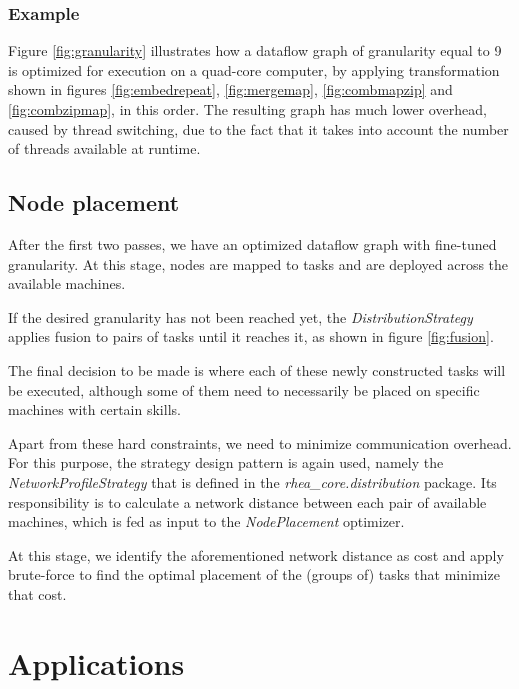 \documentclass[sigplan,review,anonymous]{acmart}
\begin{document}
\subsubsection{Example}

Figure \ref{fig:granularity} illustrates how a dataflow graph of granularity
equal to 9 is optimized for execution on a quad-core computer, by applying
transformation shown in figures \ref{fig:embedrepeat}, \ref{fig:mergemap},
\ref{fig:combmapzip} and \ref{fig:combzipmap}, in this order. The resulting
graph has much lower overhead, caused by thread switching, due to the fact that
it takes into account the number of threads available at runtime.


\subsection{Node placement}

After the first two passes, we have an optimized dataflow graph with fine-tuned
granularity. At this stage, nodes are mapped to tasks and are deployed across
the available machines.

If the desired granularity has not been reached yet, the
\textit{DistributionStrategy} applies fusion to pairs of tasks until it reaches
it, as shown in figure \ref{fig:fusion}.


The final decision to be made is where each of these newly constructed tasks
will be executed, although some of them need to necessarily be placed on
specific machines with certain skills.

Apart from these hard constraints, we need to minimize communication overhead.
For this purpose, the strategy design pattern is again used, namely the
\textit{NetworkProfileStrategy} that is defined in the
\textit{rhea\_core.distribution} package. Its responsibility is to calculate a
network distance between each pair of available machines, which is fed as input
to the \textit{NodePlacement} optimizer.

At this stage, we identify the aforementioned network distance as cost and apply
brute-force to find the optimal placement of the (groups of) tasks that minimize
that cost.

\section{Applications} \label{sec:applications}
\end{document}
